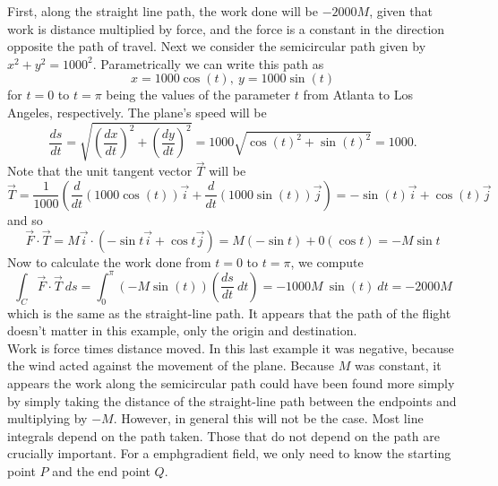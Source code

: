{First, along the straight line path, the work done will be $-2000M$, given that work is distance multiplied by force, and the force is a constant in the direction opposite the path of travel. Next we consider the semicircular path given by $x^2 + y^2 = 1000^2$.  Parametrically we can write this path as
$$x = 1000 \cos(t), \: y = 1000 \sin(t)$$
for $t = 0$ to $t = \pi$ being the values of the parameter $t$ from Atlanta to Los Angeles, respectively. The plane's speed will be
$$\dfrac{ds}{dt} = \sqrt{\left( \dfrac{dx}{dt} \right)^2 + \left( \dfrac{dy}{dt} \right)^2} = 1000 \sqrt{\cos(t)^2 + \sin(t)^2} = 1000.$$ Note that the unit tangent vector $\vec T$ will be 
$$\vec T = \dfrac{1}{1000}\left( \dfrac{d}{dt}(1000\cos(t))\vec i + \dfrac{d}{dt}(1000\sin(t)) \vec j \right)= -\sin(t) \vec i + \cos(t) \vec j$$
and so
$$\vec F \cdot \vec T= M\vec i \cdot (-\sin t \vec i+\cos t \vec j)= M(-\sin t)+0(\cos t)= -M \sin t$$
Now to calculate the work done from $t = 0$ to $t = \pi$, we compute
$$\int_{C} \vec F \cdot \vec T \: ds = \int_{0}^{\pi} \left( -M \sin(t) \right) \left( \dfrac{ds}{dt} \: dt \right) = -1000M \: \sin(t) \: dt = -2000M$$
which is the same as the straight-line path.  It appears that the path of the flight doesn't matter in this example, only the origin and destination.
}\\

Work is force times distance moved. In this last example it was negative, because the wind acted against the movement of the plane. Because $M$ was constant, it appears the work along the semicircular path could have been found more simply by simply taking the distance of the straight-line path between the endpoints and multiplying by $-M$. However, in general this will not be the case. Most line integrals depend on the path taken. Those that do not depend on the path are crucially important. For a emph{gradient field}, we only need to know the starting point $P$ and the end point $Q$.\\

